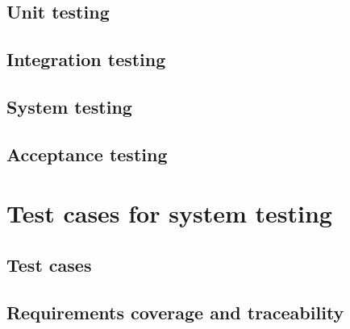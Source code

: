 \documentclass[12pt,titlepage,bibliography=totoc]{article}
\begin{document}
\subsection{Unit testing}
\subsection{Integration testing}
\subsection{System testing}
\subsection{Acceptance testing}

\section{Test cases for system testing}
\label{sec:test-cases-for-system-testing}

\subsection{Test cases}
\subsection{Requirements coverage and traceability}

{}


\end{document}
